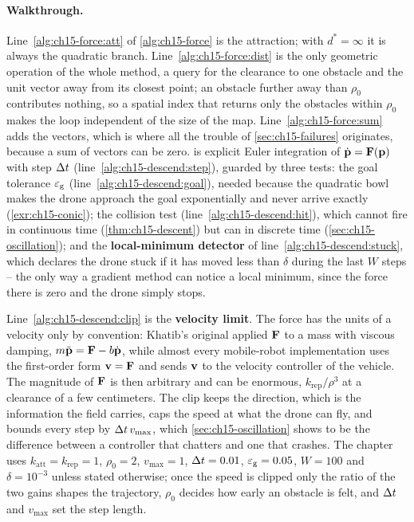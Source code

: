 \paragraph{Walkthrough.}
Line~\ref{alg:ch15-force:att} of \cref{alg:ch15-force} is the attraction;
with $d^* = \infty$ it is always the quadratic branch.
Line~\ref{alg:ch15-force:dist} is the only geometric operation of the whole
method, a query for the clearance to one obstacle and the unit vector away
from its closest point; an obstacle further away than $\rho_0$ contributes
nothing, so a spatial index that returns only the obstacles within $\rho_0$
makes the loop independent of the size of the map.
Line~\ref{alg:ch15-force:sum} adds the vectors, which is where all the
trouble of \cref{sec:ch15-failures} originates, because a sum of vectors can
be zero.  is explicit Euler integration of
$\dot{\mathbf{p}} = \mathbf{F}(\mathbf{p})$ with step $\Delta t$ (line~\ref{alg:ch15-descend:step}),
guarded by three tests: the goal tolerance $\varepsilon_{\mathrm{g}}$
(line~\ref{alg:ch15-descend:goal}), needed because the quadratic bowl makes
the drone approach the goal exponentially and never arrive exactly
(\cref{exr:ch15-conic}); the collision test (line~\ref{alg:ch15-descend:hit}),
which cannot fire in continuous time (\cref{thm:ch15-descent}) but can in
discrete time (\cref{sec:ch15-oscillation}); and the \textbf{local-minimum
detector} of
line~\ref{alg:ch15-descend:stuck}, which declares the drone stuck if it has
moved less than $\delta$ during the last $W$ steps -- the only way a gradient
method can notice a local minimum, since the force there is zero and the
drone simply stops.

Line~\ref{alg:ch15-descend:clip} is the \textbf{velocity limit}. The force has the units of a velocity only by convention: Khatib's
original applied $\mathbf{F}$ to a mass with viscous damping, $m\ddot{\mathbf{p}} =
\mathbf{F} - b\dot{\mathbf{p}}$, while almost every mobile-robot implementation uses
the first-order form $\mathbf{v} = \mathbf{F}$ and sends $\mathbf{v}$ to the velocity
controller of the vehicle. The magnitude of $\mathbf{F}$ is then arbitrary and
can be enormous, $k_{\mathrm{rep}}/\rho^3$ at a clearance of a few
centimeters. The clip keeps the direction, which is the information the
field carries, caps the speed at what the drone can fly, and bounds every
step by $\Delta t\, v_{\max}$, which \cref{sec:ch15-oscillation} shows to be the
difference between a controller that chatters and one that crashes. The
chapter uses $k_{\mathrm{att}} = k_{\mathrm{rep}} = 1$, $\rho_0 = 2$,
$v_{\max} = 1$, $\Delta t = 0.01$, $\varepsilon_{\mathrm{g}} = 0.05$, $W = 100$ and
$\delta = 10^{-3}$ unless stated otherwise; once the speed is clipped only
the ratio of the two gains shapes the trajectory, $\rho_0$ decides how early
an obstacle is felt, and $\Delta t$ and $v_{\max}$ set the step length.

